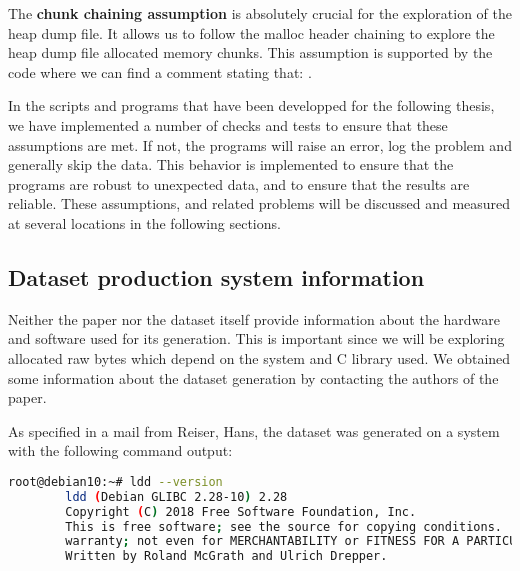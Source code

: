     The \textbf{chunk chaining assumption} is absolutely crucial for the exploration of the heap dump file. It allows us to follow the malloc header chaining to explore the heap dump file allocated memory chunks. This assumption is supported by the code where we can find a comment stating that:  \cite{MallocGLIBC2001}.

    In the scripts and programs that have been developped for the following thesis, we have implemented a number of checks and tests to ensure that these assumptions are met. If not, the programs will raise an error, log the problem and generally skip the data. This behavior is implemented to ensure that the programs are robust to unexpected data, and to ensure that the results are reliable. These assumptions, and related problems will be discussed and measured at several locations in the following sections.

    \subsection{Dataset production system information}\label{sec:methods:dataset:production_system_information}
    Neither the paper  nor the dataset itself provide information about the hardware and software used for its generation. This is important since we will be exploring allocated raw bytes which depend on the system and C library used. We obtained some information about the dataset generation by contacting the authors of the paper. 

    As specified in a mail from Reiser, Hans, the dataset was generated on a system with the following command output:

    \begin{minipage}{\dimexpr\linewidth-20pt}
    \begin{lstlisting}[language=bash, caption={Command and logs of the C-library version used for the dataset generation}]
        root@debian10:~# ldd --version
        ldd (Debian GLIBC 2.28-10) 2.28
        Copyright (C) 2018 Free Software Foundation, Inc.
        This is free software; see the source for copying conditions.  There is NO
        warranty; not even for MERCHANTABILITY or FITNESS FOR A PARTICULAR PURPOSE.
        Written by Roland McGrath and Ulrich Drepper.
    \end{lstlisting}
    \end{minipage}


